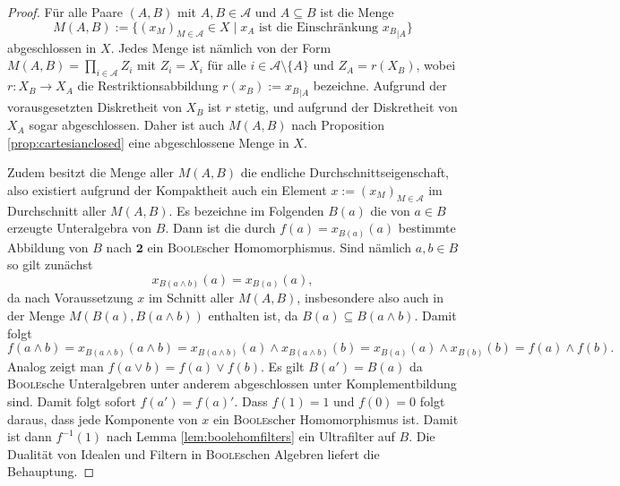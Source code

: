 \begin{proof}
  Für alle Paare $(A,B)$ mit $A,B \in \mathcal{A}$ und $A \subseteq B$ ist die Menge
  \begin{displaymath}
    M(A,B) := \{ (x_M)_{M \in \mathcal{A}} \in X \mid x_A \text{ ist die Einschränkung } {x_B}_{|A} \}
  \end{displaymath}
  abgeschlossen in $X$. 
  Jedes Menge ist nämlich von der Form $M(A,B) = \prod_{i \in \mathcal{A}} Z_i$ mit $Z_i = X_i$ für alle $i \in \mathcal{A} \setminus \{A\}$ und $Z_A = r(X_B)$, wobei $r \colon X_B \to X_A$ die Restriktionsabbildung $r(x_B) := {x_B}_{|A}$ bezeichne.
  Aufgrund der vorausgesetzten Diskretheit von $X_B$ ist $r$ stetig, und aufgrund der Diskretheit von $X_A$ sogar abgeschlossen.
  Daher ist auch $M(A,B)$ nach Proposition \ref{prop:cartesianclosed} eine abgeschlossene Menge in $X$.

  Zudem besitzt die Menge aller $M(A,B)$ die endliche Durchschnittseigenschaft, also existiert aufgrund der Kompaktheit auch ein Element $x := (x_M)_{M \in \mathcal{A}}$ im Durchschnitt aller $M(A,B)$.
  Es bezeichne im Folgenden $B(a)$ die von $a \in B$ erzeugte Unteralgebra von $B$.
  Dann ist die durch $f(a) = x_{B(a)}(a)$ bestimmte Abbildung von $B$ nach $\mathbf{2}$ ein \textsc{Boole}scher Homomorphismus.
  Sind nämlich $a,b \in B$ so gilt zunächst 
  \begin{displaymath}
    x_{B(a \land b)}(a) = x_{B(a)}(a),
  \end{displaymath}
  da nach Voraussetzung $x$ im Schnitt aller $M(A,B)$, insbesondere also auch in der Menge $M(B(a),B(a \land b))$ enthalten ist, da $B(a) \subseteq B(a \land b)$.
  Damit folgt
  \begin{displaymath}
    f(a \land b) 
    = x_{B(a \land b)}(a \land b)
    = x_{B(a \land b)}(a) \land x_{B(a \land b)}(b)
    = x_{B(a)}(a) \land x_{B(b)}(b)
    = f(a) \land f(b).
  \end{displaymath}
  Analog zeigt man $f(a \lor b) = f(a) \lor f(b)$.
  Es gilt $B(a') = B(a)$ da \textsc{Boole}sche Unteralgebren unter anderem abgeschlossen unter Komplementbildung sind.
  Damit folgt sofort $f(a') = f(a)'$.
  Dass $f(1) = 1$ und $f(0) = 0$ folgt daraus, dass jede Komponente von $x$ ein \textsc{Boole}scher Homomorphismus ist.
  Damit ist dann $f^{-1}(1)$ nach Lemma \ref{lem:boolehomfilters} ein Ultrafilter auf $B$.
  Die Dualität von Idealen und Filtern in \textsc{Boole}schen Algebren liefert die Behauptung.
\end{proof}


